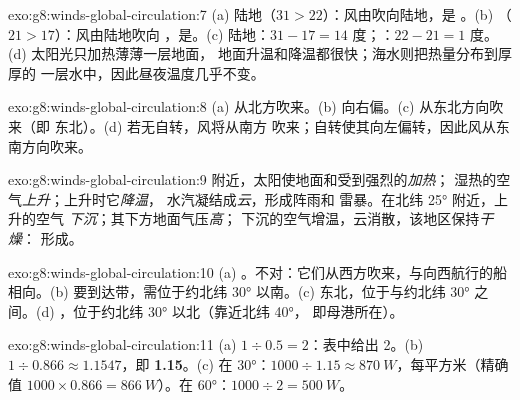 \begin{solution}{exo:g8:winds-global-circulation:7}
(a) 陆地（$31 > 22$）：风由吹向陆地，是
。(b) （$21 > 17$）：风由陆地吹向
，是。(c) 陆地：$31 - 17 = 14$ 度；：$22 -
21 = 1$ 度。(d) 太阳光只加热薄薄一层地面，
地面升温和降温都很快；海水则把热量分布到厚厚的
一层水中，因此昼夜温度几乎不变。
\end{solution}

\begin{solution}{exo:g8:winds-global-circulation:8}
(a) 从北方吹来。(b) 向右偏。(c) 从东北方向吹来（即
东北）。(d) 若无自转，风将从南方
吹来；自转使其向左偏转，因此风从东南方向吹来。
\end{solution}

\begin{solution}{exo:g8:winds-global-circulation:9}
附近，太阳使地面和受到强烈的\emph{加热}；
湿热的空气\emph{上升}；上升时它\emph{降温}，
水汽凝结成\emph{云}，形成阵雨和
雷暴。在北纬 \ang{25} 附近，上升的空气
\emph{下沉}；其下方地面气压\emph{高}；
下沉的空气增温，云消散，该地区保持\emph{干燥}：
形成。
\end{solution}

\begin{solution}{exo:g8:winds-global-circulation:10}
(a) 。不对：它们从西方吹来，与向西航行的船
相向。(b) 要到达带，需位于约北纬 \ang{30}
以南。(c) 东北，位于与约北纬 \ang{30}
之间。(d) ，位于约北纬 \ang{30} 以北（靠近北纬 \ang{40}，
即母港所在）。
\end{solution}

\begin{solution}{exo:g8:winds-global-circulation:11}
(a) $1 \div 0.5 = 2$：表中给出 2。(b) $1 \div 0.866 \approx
1.1547$，即 \textbf{1.15}。(c) 在 \ang{30}：$1000 \div 1.15 \approx
\qty{870}{W}$，每平方米（精确值 $1000 \times 0.866 =
\qty{866}{W}$）。在 \ang{60}：$1000 \div 2 = \qty{500}{W}$。
\end{solution}

